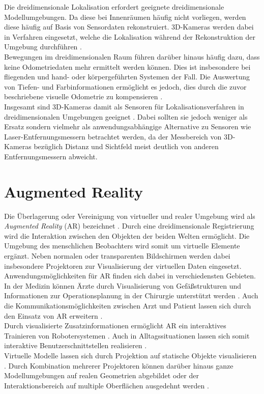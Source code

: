 Die dreidimensionale Lokalisation erfordert geeignete dreidimensionale Modellumgebungen. Da diese bei Innenräumen häufig nicht vorliegen, werden diese häufig auf Basis von Sensordaten rekonstruiert. 3D-Kameras werden dabei in Verfahren eingesetzt, welche die Lokalisation während der Rekonstruktion der Umgebung durchführen \cite{Durrant2006}.\\
Bewegungen im dreidimensionalen Raum führen darüber hinaus häufig dazu, dass keine Odometriedaten mehr ermittelt werden können. Dies ist insbesondere bei fliegenden \cite{Huang2011} und hand- oder körpergeführten Systemen \cite{Fallon2012} der Fall. Die Auswertung von Tiefen- und Farbinformationen ermöglicht es jedoch, dies durch die zuvor beschriebene visuelle Odometrie zu kompensieren \cite{Whelan2013robust}.\\
Insgesamt sind 3D-Kameras damit als Sensoren für Lokalisationsverfahren in dreidimensionalen Umgebungen geeignet \cite{Cunha2011} \cite{Eriksson2012}. 
Dabei sollten sie jedoch weniger als Ersatz sondern vielmehr als anwendungsabhängige Alternative zu Sensoren wie Laser-Entfernungsmessern betrachtet werden, da der Messbereich von 3D-Kameras bezüglich Distanz und Sichtfeld meist deutlich von anderen Entfernungsmessern abweicht.

\section{Augmented Reality}
Die Überlagerung oder Vereinigung von virtueller und realer Umgebung wird als \textit{Augmented Reality} (AR) bezeichnet \cite{Azuma1997}. Durch eine dreidimensionale Registrierung wird die Interaktion zwischen den Objekten der beiden Welten ermöglicht. Die Umgebung des menschlichen Beobachters wird somit um virtuelle Elemente ergänzt. Neben normalen oder transparenten Bildschirmen werden dabei insbesondere Projektoren zur Visualisierung der virtuellen Daten eingesetzt.\\

Anwendungsmöglichkeiten für AR finden sich dabei in verschiedensten Gebieten. In der Medizin können Ärzte durch Visualisierung von Gefäßstrukturen und Informationen zur Operationsplanung in der Chirurgie unterstützt werden \cite{Gavaghan2012}. Auch die Kommunikationsmöglichkeiten zwischen Arzt und Patient lassen sich durch den Einsatz von AR erweitern \cite{Bluteau2005}.\\
Durch visualisierte Zusatzinformationen ermöglicht AR ein interaktives Trainieren von Robotersystemen \cite{DeTommaso2012}. Auch in Alltagssituationen lassen sich somit interaktive Benutzerschnittstellen realisieren \cite{Linder2010} \cite{Huber2012}.\\ 
Virtuelle Modelle lassen sich durch Projektion auf statische Objekte visualisieren \cite{Raskar1999}. Durch Kombination mehrerer Projektoren können darüber hinaus ganze Modellumgebungen auf realen Geometrien abgebildet \cite{Low2001} oder der Interaktionsbereich auf multiple Oberflächen ausgedehnt werden \cite{Wilson2010}.

